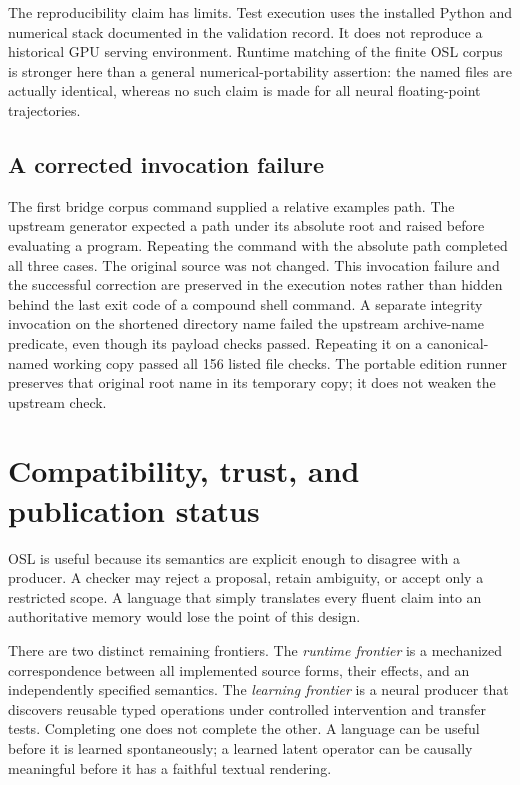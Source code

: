 \documentclass[11pt]{article}
\begin{document}
The reproducibility claim has limits. Test execution uses the installed Python and numerical stack documented in the validation record. It does not reproduce a historical GPU serving environment. Runtime matching of the finite OSL corpus is stronger here than a general numerical-portability assertion: the named files are actually identical, whereas no such claim is made for all neural floating-point trajectories.

\subsection{A corrected invocation failure}
The first bridge corpus command supplied a relative examples path. The upstream generator expected a path under its absolute root and raised  before evaluating a program. Repeating the command with the absolute path completed all three cases. The original source was not changed. This invocation failure and the successful correction are preserved in the execution notes rather than hidden behind the last exit code of a compound shell command. A separate integrity invocation on the shortened directory name  failed the upstream archive-name predicate, even though its payload checks passed. Repeating it on a canonical-named working copy passed all 156 listed file checks. The portable edition runner preserves that original root name in its temporary copy; it does not weaken the upstream check.

\section{Compatibility, trust, and publication status}
OSL is useful because its semantics are explicit enough to disagree with a producer. A checker may reject a proposal, retain ambiguity, or accept only a restricted scope. A language that simply translates every fluent claim into an authoritative memory would lose the point of this design.

There are two distinct remaining frontiers. The \emph{runtime frontier} is a mechanized correspondence between all implemented source forms, their effects, and an independently specified semantics. The \emph{learning frontier} is a neural producer that discovers reusable typed operations under controlled intervention and transfer tests. Completing one does not complete the other. A language can be useful before it is learned spontaneously; a learned latent operator can be causally meaningful before it has a faithful textual rendering.
\end{document}
